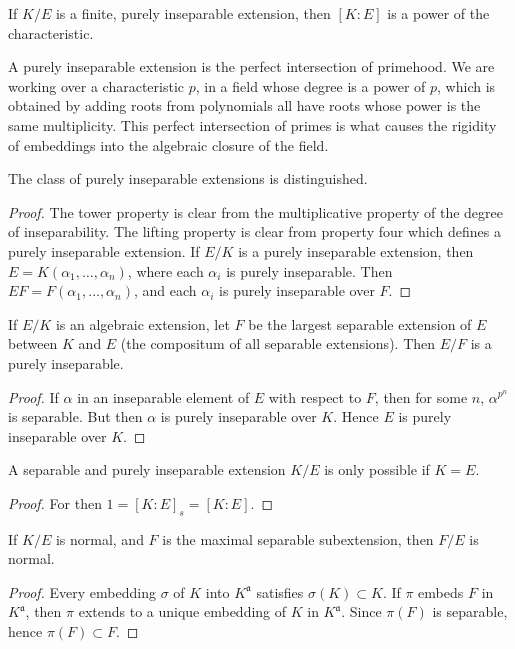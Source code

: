 \begin{corollary}
    If $K/E$ is a finite, purely inseparable extension, then $[K:E]$ is a power of the characteristic.
\end{corollary}

A purely inseparable extension is the perfect intersection of primehood. We are working over a characteristic $p$, in a field whose degree is a power of $p$, which is obtained by adding roots from polynomials all have roots whose power is the same multiplicity. This perfect intersection of primes is what causes the rigidity of embeddings into the algebraic closure of the field.

\begin{lemma}
    The class of purely inseparable extensions is distinguished.
\end{lemma}
\begin{proof}
    The tower property is clear from the multiplicative property of the degree of inseparability. The lifting property is clear from property four which defines a purely inseparable extension. If $E/K$ is a purely inseparable extension, then $E = K(\alpha_1, \dots, \alpha_n)$, where each $\alpha_i$ is purely inseparable. Then $EF = F(\alpha_1, \dots, \alpha_n)$, and each $\alpha_i$ is purely inseparable over $F$.
\end{proof}

\begin{theorem}
    If $E/K$ is an algebraic extension, let $F$ be the largest separable extension of $E$ between $K$ and $E$ (the compositum of all separable extensions). Then $E/F$ is a purely inseparable.
\end{theorem}
\begin{proof}
    If $\alpha$ in an inseparable element of $E$ with respect to $F$, then for some $n$, $\alpha^{p^n}$ is separable. But then $\alpha$ is purely inseparable over $K$. Hence $E$ is purely inseparable over $K$.
\end{proof}

\begin{corollary}
    A separable and purely inseparable extension $K/E$ is only possible if $K = E$.
\end{corollary}
\begin{proof}
    For then $1 = [K:E]_s = [K:E]$.
\end{proof}

\begin{theorem}
    If $K/E$ is normal, and $F$ is the maximal separable subextension, then $F/E$ is normal.
\end{theorem}
\begin{proof}
    Every embedding $\sigma$ of $K$ into $K^{\mathfrak{a}}$ satisfies $\sigma(K) \subset K$. If $\pi$ embeds $F$ in $K^{\mathfrak{a}}$, then $\pi$ extends to a unique embedding of $K$ in $K^{\mathfrak{a}}$. Since $\pi(F)$ is separable, hence $\pi(F) \subset F$.
\end{proof}






